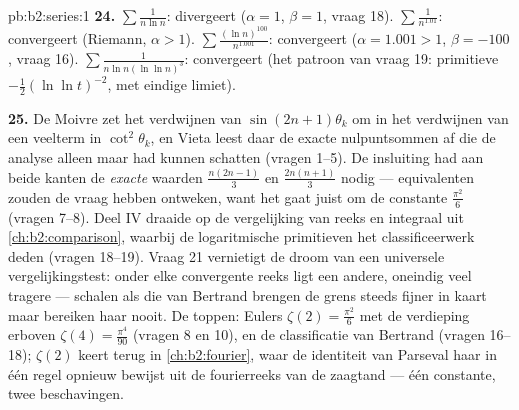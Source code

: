 \begin{solution}{pb:b2:series:1}
\textbf{24.} $\sum\frac1{n\ln n}$: divergeert ($\alpha = 1$, $\beta
= 1$, vraag 18). $\sum\frac1{n^{1.01}}$: convergeert (Riemann,
$\alpha > 1$). $\sum\frac{(\ln n)^{100}}{n^{1.001}}$: convergeert
($\alpha = 1.001 > 1$, $\beta = -100$, vraag 16).
$\sum\frac1{n\ln n(\ln\ln n)^3}$: convergeert (het patroon van
vraag 19: primitieve $-\frac12(\ln\ln t)^{-2}$, met eindige
limiet).

\textbf{25.} De Moivre zet het verdwijnen van $\sin(2n{+}1)
\theta_k$ om in het verdwijnen van een veelterm in
$\cot^2\theta_k$, en Vieta leest daar de exacte nulpuntsommen af
die de analyse alleen maar had kunnen schatten (vragen 1--5). De
insluiting had aan beide kanten de \emph{exacte} waarden
$\frac{n(2n-1)}3$ en $\frac{2n(n+1)}3$ nodig --- equivalenten
zouden de vraag hebben ontweken, want het gaat juist om de
constante $\frac{\pi^2}6$ (vragen 7--8). Deel IV draaide 
op de vergelijking van reeks en integraal uit
\cref{ch:b2:comparison}, waarbij de logaritmische primitieven het
classificeerwerk deden (vragen 18--19). Vraag 21 vernietigt de
droom van een universele vergelijkingstest: onder elke convergente
reeks ligt een andere, oneindig veel tragere --- schalen als die
van Bertrand brengen de grens steeds fijner in kaart maar bereiken
haar nooit. De toppen: Eulers $\zeta(2) = \frac{\pi^2}6$ met de
verdieping erboven $\zeta(4) = \frac{\pi^4}{90}$ (vragen 8 en 10),
en de classificatie van Bertrand (vragen 16--18); $\zeta(2)$ keert
terug in \cref{ch:b2:fourier}, waar de identiteit van Parseval haar
in één regel opnieuw bewijst uit de fourierreeks van de zaagtand
--- één constante, twee beschavingen.
\end{solution}
